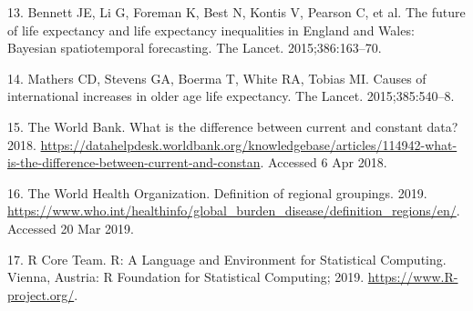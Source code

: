 \documentclass[]{elsarticle} %
\begin{document}
\leavevmode\hypertarget{ref-bennett2015future}{}%
13. Bennett JE, Li G, Foreman K, Best N, Kontis V, Pearson C, et al. The future of life expectancy and life expectancy inequalities in England and Wales: Bayesian spatiotemporal forecasting. The Lancet. 2015;386:163--70.

\leavevmode\hypertarget{ref-mathers2015causes}{}%
14. Mathers CD, Stevens GA, Boerma T, White RA, Tobias MI. Causes of international increases in older age life expectancy. The Lancet. 2015;385:540--8.

\leavevmode\hypertarget{ref-worldbankconstant}{}%
15. The World Bank. What is the difference between current and constant data? 2018. \url{https://datahelpdesk.worldbank.org/knowledgebase/articles/114942-what-is-the-difference-between-current-and-constan}. Accessed 6 Apr 2018.

\leavevmode\hypertarget{ref-WHOregion}{}%
16. The World Health Organization. Definition of regional groupings. 2019. \url{https://www.who.int/healthinfo/global_burden_disease/definition_regions/en/}. Accessed 20 Mar 2019.

\leavevmode\hypertarget{ref-R353}{}%
17. R Core Team. R: A Language and Environment for Statistical Computing. Vienna, Austria: R Foundation for Statistical Computing; 2019. \url{https://www.R-project.org/}.
\end{document}
